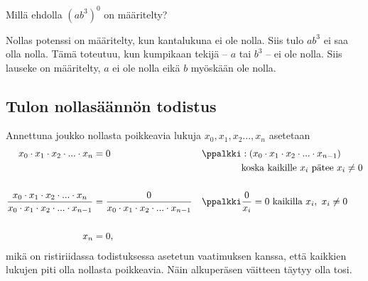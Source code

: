 \begin{esimerkki}
Millä ehdolla $(ab^3)^0$ on määritelty?
	\begin{esimratk}
	Nollas potenssi on määritelty, kun kantalukuna ei ole nolla. Siis tulo $ab^3$ ei saa olla nolla. Tämä toteutuu, kun kumpikaan tekijä -- $a$ tai $b^3$ -- ei ole nolla. Siis lauseke on määritelty, $a$ ei ole nolla eikä $b$ myöskään ole nolla.
	\end{esimratk}
\end{esimerkki}

\subsection*{\star Tulon nollasäännön todistus}

\begin{todistus}
Annettuna joukko nollasta poikkeavia lukuja $x_0, x_1, x_2 ... , x_n$ asetetaan
\begin{align*}
    x_0 \cdot x_1 \cdot x_2 \cdot ... \cdot x_n &= 0 & \ppalkki & : (x_0 \cdot x_1 \cdot x_2 \cdot ... \cdot x_{n-1}) \\
    & & & \text{koska kaikille $x_i$ pätee $x_i \neq 0$} \\
    \\
    \frac{x_0 \cdot x_1 \cdot x_2 \cdot ... \cdot x_n}{x_0 \cdot x_1 \cdot x_2 \cdot ... \cdot x_{n-1}} &=
    \frac{0}{x_0 \cdot x_1 \cdot x_2 \cdot ... \cdot x_{n-1}} & \ppalkki & \frac{0}{x_i} = 0\ \text{kaikilla $x_i,\ x_i \neq 0$} \\
    \\
    x_n &= 0, & &
\end{align*}
mikä on ristiriidassa todistuksessa asetetun vaatimuksen kanssa, että kaikkien lukujen piti olla nollasta poikkeavia. Näin alkuperäsen väitteen täytyy olla tosi.
\end{todistus}